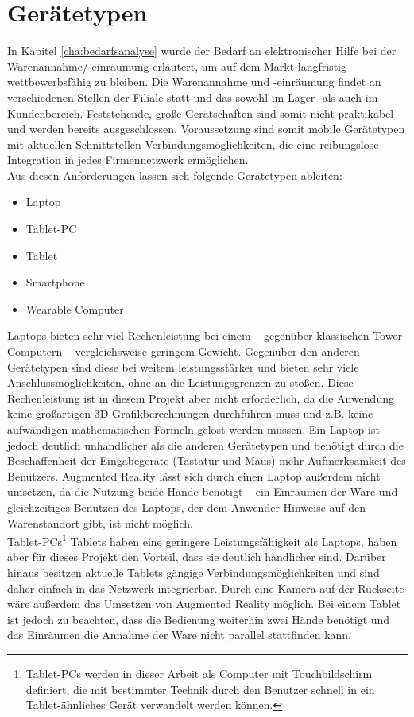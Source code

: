 \section{Gerätetypen}
\label{sec:geraete}
In Kapitel \ref{cha:bedarfsanalyse}  wurde der Bedarf an elektronischer Hilfe bei der Warenannahme/-einräumung erläutert, um auf dem Markt langfristig wettbewerbsfähig zu bleiben. Die Warenannahme und -einräumung findet an verschiedenen Stellen der Filiale statt und das sowohl im Lager- als auch im Kundenbereich. Feststehende, große Gerätschaften sind somit nicht praktikabel und werden bereits ausgeschlossen. Voraussetzung sind somit mobile Gerätetypen mit aktuellen Schnittstellen \bzw Verbindungsmöglichkeiten, die eine reibungslose Integration in jedes Firmennetzwerk ermöglichen.\\
Aus diesen Anforderungen lassen sich folgende Gerätetypen ableiten:
\begin{itemize}
	\item Laptop
	\item Tablet-PC
	\item Tablet
	\item Smartphone
	\item Wearable Computer
\end{itemize}
Laptops bieten sehr viel Rechenleistung bei einem -- gegenüber klassischen Tower-Computern -- vergleichsweise geringem Gewicht. Gegenüber den anderen Gerätetypen sind diese bei weitem leistungsstärker und bieten sehr viele Anschlussmöglichkeiten, ohne an die Leistungsgrenzen zu stoßen. Diese Rechenleistung ist in diesem Projekt aber nicht erforderlich, da die Anwendung keine großartigen \acs{3D}-Grafikberechnungen durchführen muss und z.B. keine aufwändigen mathematischen Formeln gelöst werden müssen. Ein Laptop ist jedoch deutlich unhandlicher als die anderen Gerätetypen und benötigt durch die Beschaffenheit der Eingabegeräte (Tastatur und Maus) mehr Aufmerksamkeit des Benutzers. Augmented Reality lässt sich durch einen Laptop außerdem nicht umsetzen, da die Nutzung beide Hände benötigt -- ein Einräumen der Ware und gleichzeitiges Benutzen des Laptops, der dem Anwender Hinweise auf den Warenstandort gibt, ist nicht möglich.\\

Tablet-PCs\footnote{Tablet-PCs werden in dieser Arbeit als Computer mit Touchbildschirm definiert, die mit bestimmter Technik durch den Benutzer schnell in ein Tablet-ähnliches Gerät verwandelt werden können.} \bzw Tablets haben eine geringere Leistungsfähigkeit als Laptops, haben aber für dieses Projekt den Vorteil, dass sie deutlich handlicher sind. Darüber hinaus besitzen aktuelle Tablets gängige Verbindungsmöglichkeiten und sind daher einfach in das Netzwerk integrierbar. Durch eine Kamera auf der Rückseite wäre außerdem das Umsetzen von Augmented Reality möglich. Bei einem Tablet ist jedoch zu beachten, dass die Bedienung weiterhin zwei Hände benötigt und das Einräumen \bzw die Annahme der Ware nicht parallel stattfinden kann.\\

